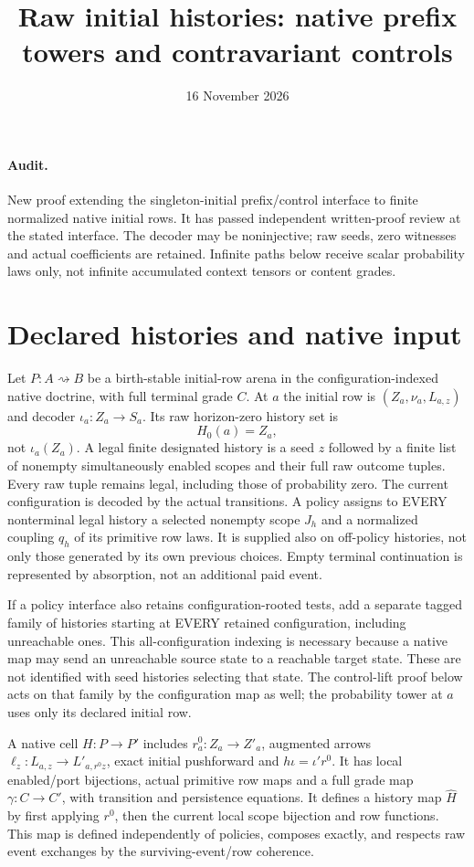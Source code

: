 \documentclass[11pt]{article}
\title{Raw initial histories: native prefix towers and contravariant controls}
\date{16 November 2026}
\begin{document}
\maketitle
\paragraph{Audit.} New proof extending the singleton-initial prefix/control interface to finite normalized native initial rows. It has passed independent written-proof review at the stated interface. The decoder may be noninjective; raw seeds, zero witnesses and actual coefficients are retained. Infinite paths below receive scalar probability laws only, not infinite accumulated context tensors or content grades.

\section{Declared histories and native input}
Let $P:A\rightsquigarrow B$ be a birth-stable initial-row arena in the
configuration-indexed native doctrine, with full terminal grade $C$.
At $a$ the initial row is $(Z_a,\nu_a,L_{a,z})$ and decoder
$\iota_a:Z_a\to S_a$. Its raw horizon-zero history set is
\[
 H_0(a)=Z_a,
\]
not $\iota_a(Z_a)$. A legal finite designated history is a seed $z$ followed
by a finite list of nonempty simultaneously enabled scopes and their full
raw outcome tuples. Every raw tuple remains legal, including those of
probability zero. The current configuration is decoded by the actual
transitions. A policy assigns to EVERY nonterminal legal history a selected
nonempty scope $J_h$ and a normalized coupling $q_h$ of its primitive row
laws. It is supplied also on off-policy histories, not only those generated
by its own previous choices. Empty terminal continuation is represented by
absorption, not an additional paid event.

If a policy interface also retains configuration-rooted tests, add a separate
tagged family of histories starting at EVERY retained configuration, including
unreachable ones. This all-configuration indexing is necessary because a native
map may send an unreachable source state to a reachable target state.
These are not identified with seed histories selecting that state. The
control-lift proof below acts on that family by the configuration map as
well; the probability tower at $a$ uses only its declared initial row.

A native cell $H:P\to P'$ includes $r^0_a:Z_a\to Z'_a$, augmented arrows
$\ell_z:L_{a,z}\to L'_{a,r^0z}$, exact initial pushforward and
$h\iota=\iota'r^0$. It has local enabled/port bijections, actual primitive
row maps and a full grade map $\gamma:C\to C'$, with transition and
persistence equations. It defines a history map $\widehat H$ by first
applying $r^0$, then the current local scope bijection and row functions.
This map is defined independently of policies, composes exactly, and respects
raw event exchanges by the surviving-event/row coherence.
\end{document}

